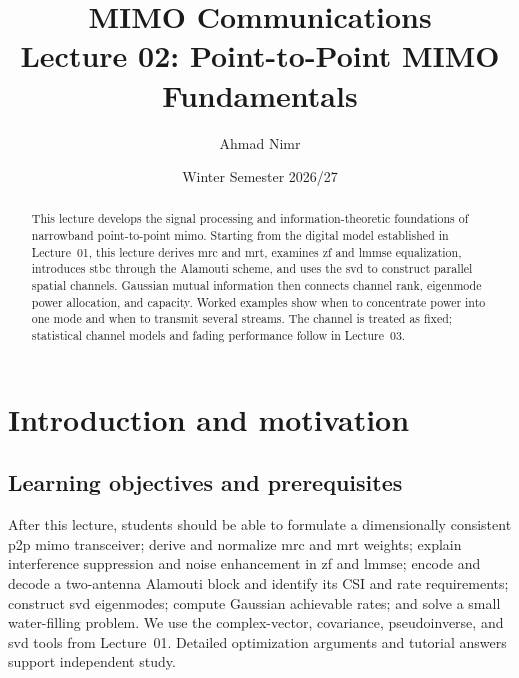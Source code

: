 


\providecommand{\RH}{R_{\ma{H}}}
\title{MIMO Communications\\Lecture 02: Point-to-Point MIMO Fundamentals}
\author{Ahmad Nimr}
\date{Winter Semester 2026/27}





\maketitle
\begin{abstract}
This lecture develops the signal processing and information-theoretic foundations of narrowband point-to-point \ac{mimo}. Starting from the digital model established in Lecture~01, this lecture derives \ac{mrc} and \ac{mrt}, examines \ac{zf} and \ac{lmmse} equalization, introduces \ac{stbc} through the Alamouti scheme, and uses the \ac{svd} to construct parallel spatial channels. Gaussian mutual information then connects channel rank, eigenmode power allocation, and capacity. Worked examples show when to concentrate power into one mode and when to transmit several streams. The channel is treated as fixed; statistical channel models and fading performance follow in Lecture~03.
\end{abstract}
\acresetall
\tableofcontents
\newpage

\section{Introduction and motivation}
\subsection{Learning objectives and prerequisites}
After this lecture, students should be able to formulate a dimensionally consistent \ac{p2p} \ac{mimo} transceiver; derive and normalize \ac{mrc} and \ac{mrt} weights; explain interference suppression and noise enhancement in \ac{zf} and \ac{lmmse}; encode and decode a two-antenna Alamouti block and identify its CSI and rate requirements; construct \ac{svd} eigenmodes; compute Gaussian achievable rates; and solve a small water-filling problem. We use the complex-vector, covariance, pseudoinverse, and \ac{svd} tools from Lecture~01. Detailed optimization arguments and tutorial answers support independent study.



